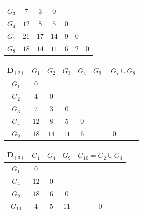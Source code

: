 \begin{enumerate}
\begin{enumerate}[label=(\arabic*)]
\begin{table}[H]
\begin{tabular}{|c|c|c|c|c|c|c|}
                    $G_3$ & $7$ & $3$ & $0$ & & & \\ \hline
                    $G_4$ & $12$ & $8$ & $5$ & $0$ & & \\ \hline
                    $G_7$ & $21$ & $17$ & $14$ & $9$ & $0$ & \\ \hline
                    $G_8$ & $18$ & $14$ & $11$ & $6$ & $\textit{2}$ & $0$ \\ \hline
                \end{tabular}
            \end{table}
            \begin{table}[H]
                \centering
                \begin{tabular}{|c|c|c|c|c|c|}
                    \hline
                    $\pmb{D}_{(2)}$ & $G_1$ & $G_2$ & $G_3$ & $G_4$ & $G_9=G_7 \cup G_8$ \\ \hline
                    $G_1$ & $0$ & & & & \\ \hline
                    $G_2$ & $4$ & $0$ & & & \\ \hline
                    $G_3$ & $7$ & $\textit{3}$ & $0$ & & \\ \hline
                    $G_4$ & $12$ & $8$ & $5$ & $0$ & \\ \hline
                    $G_9$ & $18$ & $14$ & $11$ & $6$ & $0$ \\ \hline
                \end{tabular}
            \end{table}
            \begin{table}[H]
                \centering
                \begin{tabular}{|c|c|c|c|c|}
                    \hline
                    $\pmb{D}_{(3)}$ & $G_1$ & $G_4$ & $G_9$ & $G_{10}=G_2 \cup G_3$ \\ \hline
                    $G_1$ & $0$ & & & \\ \hline
                    $G_4$ & $12$ & $0$ & & \\ \hline
                    $G_9$ & $18$ & $6$ & $0$ & \\ \hline
                    $G_{10}$ & $\textit{4}$ & $5$ & $11$ & $0$ \\ \hline
                \end{tabular}
            \end{table}
            \begin{table}[H]
                \centering
                \begin{tabular}{|c|c|c|c|c|}

\end{tabular}
\end{table}
\end{enumerate}
\end{enumerate}

